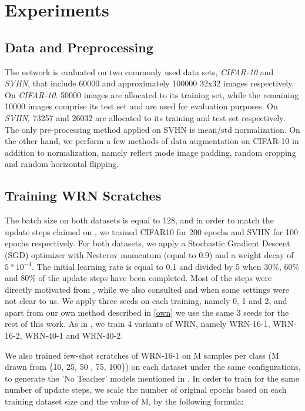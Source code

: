 \section{Experiments} 

\subsection{Data and Preprocessing}

The network is evaluated on two commonly used data sets, \textit{CIFAR-10} and \textit{SVHN}, that include 60000 and approximately 100000 32x32 images respectively. On \textit{CIFAR-10}. 50000 images are allocated to its training set, while the remaining 10000 images comprise its test set and are used for evaluation purposes. On \textit{SVHN}, 73257 and 26032 are allocated to its training and test set respectively. The only pre-processing method applied on SVHN is mean/std normalization. On the other hand, we perform a few methods of data augmentation on CIFAR-10 in addition to normalization, namely reflect mode image padding, random cropping and random horizontal flipping. 

\subsection{Training WRN Scratches} %

The batch size on both datasets is equal to 128, and in order to match the update steps claimed on \cite{Micaelli2019ZeroShotKT}, we trained CIFAR10 for 200 epochs and SVHN for 100 epochs respectively. For both datasets, we apply a Stochastic Gradient Descent (SGD) optimizer with Nesterov momentum (equal to 0.9) and a  weight decay of $5*10^{-4}$. The initial learning rate is equal to 0.1 and divided by 5 when 30\%, 60\% and 80\% of the update steps have been completed. Most of the steps were directly motivated from \cite{Micaelli2019ZeroShotKT}, while we also consulted \cite{zagoruyko2016paying} and \cite{wrn} when some settings were not clear to us. We apply three seeds on each training, namely 0, 1 and 2, and apart from our own method described in \ref{own} we use the same 3 seeds for the rest of this work. As in \cite{Micaelli2019ZeroShotKT}, we train 4 variants of WRN, namely WRN-16-1, WRN-16-2, WRN-40-1 and WRN-40-2. 

We also trained few-shot scratches of WRN-16-1 on M samples per class (M drawn from \{10, 25, 50 , 75, 100\}) on each dataset under the same configurations, to generate the 'No Teacher' models mentioned in \cite{Micaelli2019ZeroShotKT}. In order to train for the same number of update steps, we scale the number of original epochs based on each training dataset size and the value of M, by the following formula:

